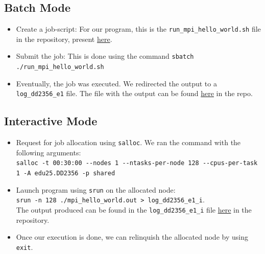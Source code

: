 \documentclass[a4paper,10pt]{article}
\begin{document}
\subsection{Batch Mode}
\begin{itemize}
\item Create a job-script: For our program, this is the \verb|run_mpi_hello_world.sh| file in the repository, present \href{https://github.com/paulmyr/DD2356-MethodsHPC/blob/master/1_dardel_simple_benchmarking/code/run_mpi_hello_world.sh}{here}.
\item Submit the job: This is done using the command \verb|sbatch ./run_mpi_hello_world.sh|
\item Eventually, the job was executed. We redirected the output to a \verb|log_dd2356_e1| file. The file with the output can be found \href{https://github.com/paulmyr/DD2356-MethodsHPC/blob/master/1_dardel_simple_benchmarking/code/log_dd2356_e1}{here} in the repo.
\end{itemize}

\subsection{Interactive Mode}
\begin{itemize}
\item Request for job allocation using \verb|salloc|. We ran the command with the following arguments: \\ {\small \verb|salloc -t 00:30:00 --nodes 1 --ntasks-per-node 128 --cpus-per-task 1 -A edu25.DD2356 -p shared|}
\item Launch program using \verb|srun| on the allocated node: \\ \verb|srun -n 128 ./mpi_hello_world.out > log_dd2356_e1_i|. \\ The output produced can be found in the \verb|log_dd2356_e1_i| file \href{https://github.com/paulmyr/DD2356-MethodsHPC/blob/master/1_dardel_simple_benchmarking/code/log_dd2356_e1_i}{here} in the repository. 
\item Once our execution is done, we can relinquish the allocated node by using \verb|exit|.  
\end{itemize}


\end{document}
